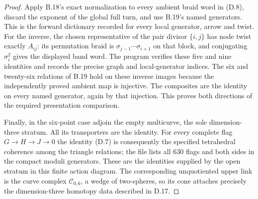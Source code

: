 \begin{proof}
Apply B.18's exact normalization to every ambient braid word
in (D.8), discard the exponent of the global full turn, and
use B.19's named generators.  This is the forward dictionary
recorded for every local generator, arrow and twist.  For
the inverse, the chosen representative of the pair divisor
$\{i,j\}$ has node twist exactly $A_{ij}$: its permutation
braid is $\sigma_{j-1}\cdots\sigma_{i+1}$ on that block,
and conjugating $\sigma_i^2$ gives the displayed band word.
The program verifies these five and nine identities and
records the precise graph and local-generator indices.
The six and twenty-six relations of B.19 hold on these
inverse images because the independently proved ambient
map is injective.  The composites are the identity on every
named generator, again by that injection.  This proves both
directions of the required presentation comparison.

Finally, in the six-point case adjoin the empty multicurve,
the sole dimension-three stratum.  All its transporters are
the identity.  For every complete flag $G\to H\to J\to0$
the identity (D.7) is consequently the specified
tetrahedral coherence among the triangle relations; the
file lists all $630$ flags and both sides in the compact
moduli generators.  These are the identities supplied by
the open stratum in this finite action diagram.  The
corresponding unquotiented upper link is the curve complex
$\mathcal C_{0,6}$, a wedge of two-spheres, so its cone
attaches precisely the dimension-three homotopy data
described in D.17.
\end{proof}

